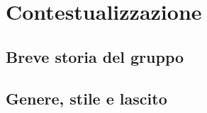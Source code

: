 \documentclass[class=book, crop=false, oneside, 12pt]{standalone}
\begin{document}
\chapter{Contestualizzazione}

\section{Breve storia del gruppo}
\section{Genere, stile e lascito}


\end{document}
